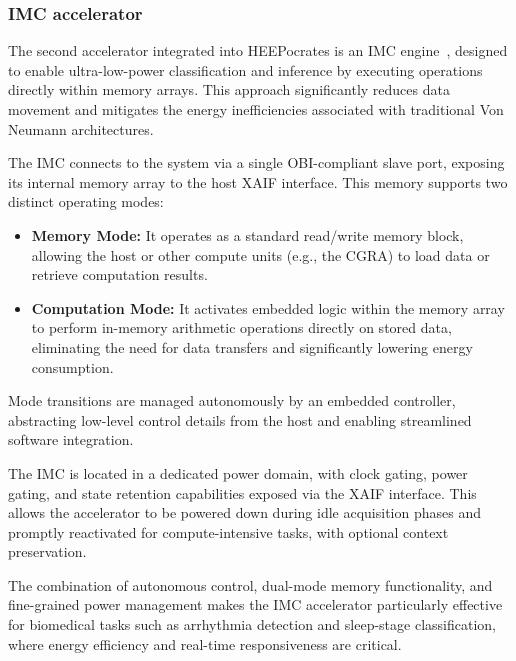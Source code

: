             \vspace{-1em}
            \subsubsection*{IMC accelerator}
            
                The second accelerator integrated into \mbox{HEEPocrates} is an IMC engine~\cite{blade}, designed to enable ultra-low-power classification and inference by executing operations directly within memory arrays. This approach significantly reduces data movement and mitigates the energy inefficiencies associated with traditional Von Neumann architectures.
                
                The IMC connects to the system via a single OBI-compliant slave port, exposing its internal memory array to the host XAIF interface. This memory supports two distinct operating modes:

                \vspace{-1em}
                \begin{itemize}
                    \item \textbf{Memory Mode:} It operates as a standard read/write memory block, allowing the host or other compute units (e.g., the CGRA) to load data or retrieve computation results.
                    
                    \item \textbf{Computation Mode:} It activates embedded logic within the memory array to perform in-memory arithmetic operations directly on stored data, eliminating the need for data transfers and significantly lowering energy consumption.
                \end{itemize}
                \vspace{-1em}
                
                Mode transitions are managed autonomously by an embedded controller, abstracting low-level control details from the host and enabling streamlined software integration.
                
                The IMC is located in a dedicated power domain, with clock gating, power gating, and state retention capabilities exposed via the XAIF interface. This allows the accelerator to be powered down during idle acquisition phases and promptly reactivated for compute-intensive tasks, with optional context preservation.
                
                The combination of autonomous control, dual-mode memory functionality, and fine-grained power management makes the IMC accelerator particularly effective for biomedical tasks such as arrhythmia detection and sleep-stage classification, where energy efficiency and real-time responsiveness are critical.

